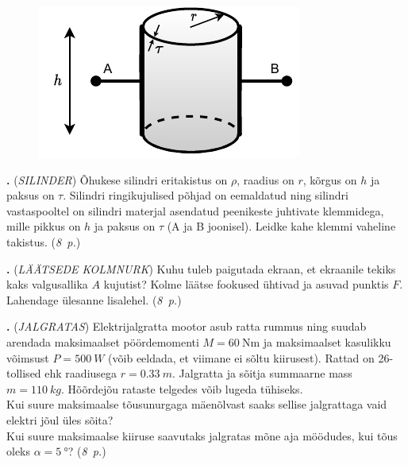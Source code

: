 \documentclass[11pt,a5paper]{article}
\newcommand{\numb}[1]{\vspace{5pt}\textbf{\large #1}}
\newcommand{\nimi}[1]{(\textsl{\small #1})}
\newcommand{\punktid}[1]{(\emph{#1~p.})}
\newcounter{ylesanne}
\newcommand{\yl}[1]{\addtocounter{ylesanne}{1}\numb{\theylesanne.} \nimi{#1} \newblock{}}
\newcommand{\autor}[1]{}%
\begin{document}
\begin{figure}
  \vspace{-2em}
  \begin{center}
    \includegraphics[width=\linewidth]{silinder.pdf}
  \end{center}
  \vspace{-2em}
\end{figure}

\yl{SILINDER} Õhukese silindri eritakistus on $\rho$, raadius on $r$, kõrgus on $h$ ja paksus on $\tau$. Silindri ringikujulised põhjad on eemaldatud ning silindri vastaspooltel on silindri materjal asendatud peenikeste juhtivate klemmidega, mille pikkus on $h$ ja paksus on $\tau$ (A ja B joonisel). Leidke kahe klemmi vaheline takistus.
\punktid{8} \autor{Richard Luhtaru}


\yl{LÄÄTSEDE KOLMNURK}
Kuhu tuleb paigutada ekraan, et ekraanile tekiks kaks valgusallika $A$ kujutist? Kolme läätse fookused ühtivad ja asuvad punktis $F$. Lahendage ülesanne lisalehel.
\punktid{8} \autor{Erkki Tempel}
\newpage

\yl{JALGRATAS}
Elektrijalgratta mootor asub ratta rummus ning suudab arendada maksimaalset pöördemomenti $M=\SI{60}{\newton\meter}$ ja maksimaalset kasulikku võimsust $P=\SI{500}{W}$ (võib eeldada, et viimane ei sõltu kiirusest). Rattad on 26-tollised ehk raadiusega $r=\SI{0.33}{m}$. Jalgratta ja sõitja summaarne mass $m=\SI{110}{kg}$. Hõõrdejõu rataste telgedes võib lugeda tühiseks. \\
\osa Kui suure maksimaalse tõusunurgaga mäenõlvast saaks sellise jalgrattaga vaid elektri jõul üles sõita? \\
\osa Kui suure maksimaalse kiiruse saavutaks jalgratas mõne aja möödudes, kui tõus oleks $\alpha=\SI{5}{\degree}$? \punktid{8} \autor{Valter Kiisk}
\end{document}
